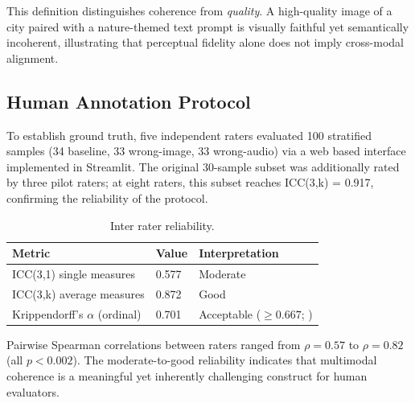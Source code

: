 \documentclass[a4paper,fleqn]{cas-sc}
\begin{document}
This definition distinguishes coherence from \emph{quality}. A high-quality image of a city paired with a nature-themed text prompt is visually faithful yet semantically incoherent, illustrating that perceptual fidelity alone does not imply cross-modal alignment.

\subsection{Human Annotation Protocol}

To establish ground truth, five independent raters evaluated 100 stratified samples (34 baseline, 33 wrong-image, 33 wrong-audio) via a web based interface implemented in Streamlit. The original 30-sample subset was additionally rated by three pilot raters; at eight raters, this subset reaches ICC(3,k) = 0.917, confirming the reliability of the protocol.

\begin{table}[!b]
\centering
\caption{Inter rater reliability.}
\label{tab:irr}
\begin{tabular}{lll}
\toprule
Metric & Value & Interpretation \\
\midrule
ICC(3,1) single measures & 0.577 & Moderate \citep{Koo2016} \\
ICC(3,k) average measures & 0.872 & Good \\
Krippendorff's $\alpha$ (ordinal) & 0.701 & Acceptable ($\geq 0.667$; \citealp{Krippendorff2011}) \\
\bottomrule
\end{tabular}
\end{table}

Pairwise Spearman correlations between raters ranged from $\rho = 0.57$ to $\rho = 0.82$ (all $p < 0.002$). The moderate-to-good reliability indicates that multimodal coherence is a meaningful yet inherently challenging construct for human evaluators.
\end{document}

